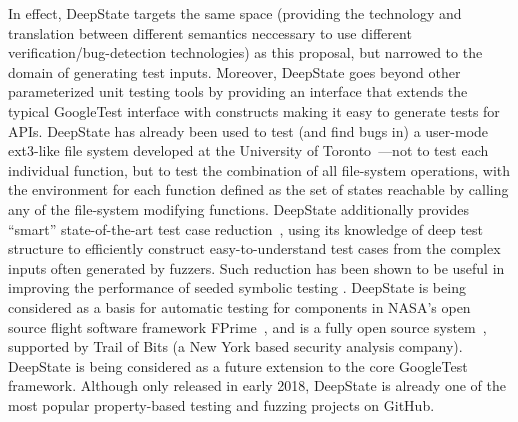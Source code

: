 In effect, DeepState targets the same space (providing the technology and translation between different semantics neccessary to use different verification/bug-detection technologies) as this proposal, but narrowed to the domain of generating test inputs.  Moreover, DeepState goes beyond other parameterized unit testing tools by providing an interface that extends the typical GoogleTest interface with constructs making it easy to generate tests for APIs.  DeepState has already been used to test (and find bugs in) a user-mode ext3-like file system developed at the University of Toronto~\cite{testfs,testfsrepo}---not to test each individual function, but to test the combination of all file-system operations, with the environment for each function defined as the set of states reachable by calling any of the file-system modifying functions.  DeepState additionally provides ``smart'' state-of-the-art test case reduction~\cite{OneTest}, using its knowledge of deep test structure to efficiently construct easy-to-understand test cases from the complex inputs often generated by fuzzers.  Such reduction has been shown to be useful in improving the performance of seeded symbolic testing \cite{issta14}.
DeepState is being considered as a basis for automatic testing for components in NASA's open source flight software framework FPrime~\cite{fprime,fprimerepo}, and is a fully open source system~\cite{deepstaterepo}, supported by Trail of Bits (a New York based security analysis company).  DeepState is being considered as a future extension to the core GoogleTest framework.  Although only released in early 2018, DeepState is already one of the most popular property-based testing and fuzzing projects on GitHub.